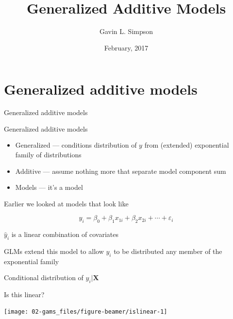 \documentclass[10pt,ignorenonframetext,compress, aspectratio=169]{beamer}
\title{Generalized Additive Models}
\author{Gavin L. Simpson}
\date{February, 2017}
\providecommand{\tightlist}{%
  \setlength{\itemsep}{0pt}\setlength{\parskip}{0pt}}
\begin{document}
\frame{\titlepage}

\section{Generalized additive models}\label{generalized-additive-models}

\begin{frame}{Generalized additive models}

\alert{Generalized additive models}

\begin{itemize}
\tightlist
\item
  Generalized --- conditions distribution of \(y\) from (extended)
  exponential family of distributions
\item
  Additive --- assume nothing more that separate model component sum
\item
  Models --- it's a model
\end{itemize}

Earlier we looked at models that look like

\[
y_i = \beta_0 + \beta_1 x_{1i} + \beta_2 x_{2i} + \cdots + \varepsilon_i
\]

\(\hat{y}_i\) is a linear combination of covariates

GLMs extend this model to allow \(y_i\) to be distributed any member of
the exponential family

Conditional distribution of \(y_i | \mathbf{X}\)

\end{frame}

\begin{frame}{Is this linear?}

\begin{center}\texttt{[image: 02-gams\_files/figure-beamer/islinear-1]} \end{center}

\end{frame}
\end{document}
